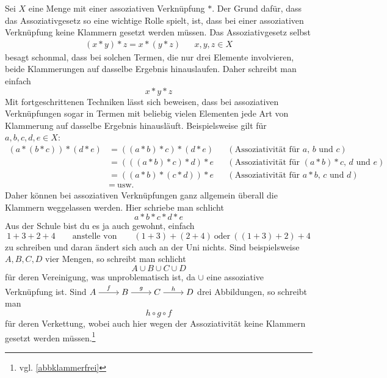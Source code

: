 \begin{bem} \label{klammerfrei}
    Sei $X$ eine Menge mit einer assoziativen Verknüpfung $*$. Der Grund dafür, dass das Assoziativgesetz so eine wichtige Rolle spielt, ist, dass bei einer assoziativen Verknüpfung keine Klammern gesetzt werden müssen. Das Assoziativgesetz selbst
    \begin{align*}
        (x*y)*z = x*(y*z) && x,y,z\in X
    \end{align*}
    besagt schonmal, dass bei solchen Termen, die nur drei Elemente involvieren, beide Klammerungen auf dasselbe Ergebnis hinauslaufen. Daher schreibt man einfach
        \[ x*y*z \]
    Mit fortgeschrittenen Techniken lässt sich beweisen, dass bei assoziativen Verknüpfungen sogar in Termen mit beliebig vielen Elementen jede Art von Klammerung auf dasselbe Ergebnis hinausläuft. Beispielsweise gilt für $a,b,c,d,e\in X$:
    \begin{align*}
        (a*(b*c))*(d*e) & =((a*b)*c)*(d*e) && (\text{Assoziativität für $a$, $b$ und $c$})\\
        & = (((a*b)*c)*d)*e && (\text{Assoziativität für $(a*b)*c$, $d$ und $e$})  \\
        & = ((a*b)*(c*d))*e && (\text{Assoziativität für $a*b$, $c$ und $d$})\\
        &=\ \text{usw.}
    \end{align*}
    Daher können bei assoziativen Verknüpfungen ganz allgemein überall die Klammern weggelassen werden. Hier schriebe man schlicht
        \[ a*b*c*d*e \]
    Aus der Schule bist du es ja auch gewohnt, einfach
        \[ 1+3+2+4 \qquad\text{anstelle von}\qquad (1+3)+(2+4)\ \text{oder}\ ((1+3)+2)+4 \]
    zu schreiben und daran ändert sich auch an der Uni nichts. Sind beispielsweise $A,B,C,D$ vier Mengen, so schreibt man schlicht
        \[ A\cup B\cup C \cup D \]
    für deren Vereinigung, was unproblematisch ist, da $\cup$ eine assoziative Verknüpfung ist. Sind $\begin{tikzcd}[cramped] A\ar[r, "f"] & B\ar[r, "g"] & C \ar[r, "h"] & D \end{tikzcd}$ drei Abbildungen, so schreibt man
        \[ h\circ g\circ f \]
    für deren Verkettung, wobei auch hier wegen der Assoziativität keine Klammern gesetzt werden müssen.\footnote{vgl. \cref{abbklammerfrei}}
\end{bem}


